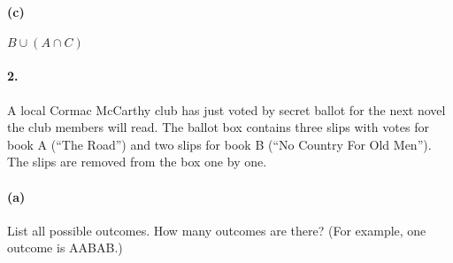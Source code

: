 \begin{multicols}{3}
        \columnbreak

        \paragraph*{(c)}
        $B \cup (A \cap C)$

        \begin{mdframed}
        \end{mdframed}
    \end{multicols}

    \paragraph*{2.}
    A local Cormac McCarthy club has just voted by secret ballot for the next novel the club members will read. The ballot box contains three slips with votes for book A (“The Road”) and two slips for book B (“No Country For Old Men”). The slips are removed from the box one by one.

    \paragraph*{(a)}
    List all possible outcomes. How many outcomes are there? (For example, one outcome is AABAB.)

